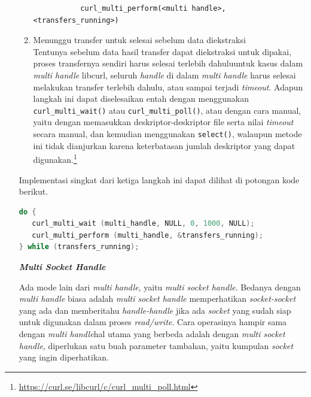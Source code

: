 \documentclass[a4paper,twoside]{article}
\begin{document}
\begin{enumerate}
\begin{enumerate}
\begin{verbatim}
           curl_multi_perform(<multi handle>, <transfers_running>)
\end{verbatim}

	\item Menunggu transfer untuk selesai sebelum data diekstraksi\\
	Tentunya sebelum data hasil transfer dapat diekstraksi untuk dipakai, proses transfernya sendiri harus selesai terlebih dahulu\textemdash untuk kasus dalam \textit{multi handle} libcurl, seluruh \textit{handle} di dalam \textit{multi handle} harus selesai melakukan transfer terlebih dahulu, atau sampai terjadi \textit{timeout}. Adapun langkah ini dapat diselesaikan entah dengan menggunakan \verb|curl_multi_wait()| atau \verb|curl_multi_poll()|, atau dengan cara manual, yaitu dengan memasukkan deskriptor-deskriptor file serta nilai \textit{timeout} secara manual, dan kemudian menggunakan \verb|select()|, walaupun metode ini tidak dianjurkan karena keterbatasan jumlah deskriptor yang dapat digunakan.\footnote{\href{https://curl.se/libcurl/c/curl\_multi\_poll.html}{https://curl.se/libcurl/c/curl\_multi\_poll.html}}
\end{enumerate}
\noindent
Implementasi singkat dari ketiga langkah ini dapat dilihat di potongan kode berikut.

\begin{lstlisting}[language=C, caption=Loop sederhana dari pengunaan \textit{multi handle} curl, label=code:curl-usage-multi]
do {
   curl_multi_wait (multi_handle, NULL, 0, 1000, NULL);
   curl_multi_perform (multi_handle, &transfers_running);
} while (transfers_running);
\end{lstlisting}

\textbf{\textit{Multi Socket Handle}}
\label{sec:cmodules-libcurl-handlemultisocket}

Ada mode lain dari \textit{multi handle}, yaitu \textit{multi socket handle}. Bedanya dengan \textit{multi handle} biasa adalah \textit{multi socket handle} memperhatikan \textit{socket-socket} yang ada dan memberitahu \textit{handle-handle} jika ada \textit{socket} yang sudah siap untuk digunakan dalam proses \textit{read/write}. Cara operasinya hampir sama dengan \textit{multi handle}\textemdash hal utama yang berbeda adalah dengan \textit{multi socket handle}, diperlukan satu buah parameter tambahan, yaitu kumpulan \textit{socket} yang ingin diperhatikan.


\end{enumerate}
\end{document}
